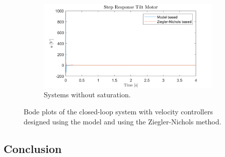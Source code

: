 \documentclass[../../main.tex]{subfiles}
\begin{document}
\begin{figure}[h]
\begin{subfigure}{0.48\textwidth}
    \includegraphics[width = 0.97\textwidth]{Sections/System_Design/Images/cascade_step_u_NoSat.png}
    \caption{Systems without saturation.}
    \label{fig:RL_cascade_NZ}
\end{subfigure}
\caption{Bode plots of the closed-loop system with velocity controllers designed using the model and using the Ziegler-Nichols method.}
\label{fig:RL_cascade}
\end{figure}




\subsection{Conclusion}
\end{document}
